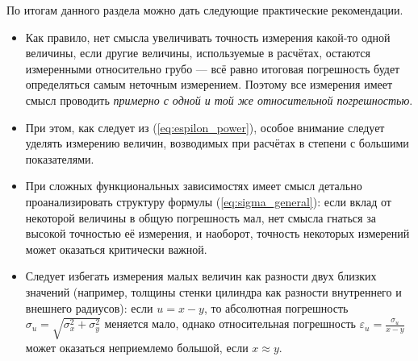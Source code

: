 По итогам данного раздела можно дать следующие практические рекомендации.
\begin{itemize}\small
\item Как правило, нет смысла увеличивать точность измерения какой-то одной
величины, если другие величины, используемые в расчётах, остаются
измеренными относительно грубо --- всё равно итоговая погрешность
будет определяться самым неточным измерением. Поэтому
все измерения имеет смысл проводить \emph{примерно с одной и той же
относительной погрешностью}.
\item При этом, как следует из (\ref{eq:espilon_power}), особое внимание
следует уделять измерению величин, возводимых при расчётах в степени
с большими показателями. 
\item При сложных функциональных зависимостях
имеет смысл детально проанализировать структуру формулы
(\ref{eq:sigma_general}):
если вклад от некоторой величины в общую погрешность мал, нет смысла
гнаться за высокой точностью её измерения, и наоборот, точность некоторых
измерений может оказаться критически важной.
\item Следует избегать измерения малых величин как разности двух близких
значений (например, толщины стенки цилиндра как разности внутреннего
и внешнего радиусов): если $u=x-y$, то абсолютная погрешность
$\sigma_{u}=\sqrt{\sigma_{x}^{2}+\sigma_{y}^{2}}$
меняется мало, однако относительная погрешность
$\varepsilon_{u}=\frac{\sigma_{u}}{x-y}$
может оказаться неприемлемо большой, если $x\approx y$.
\end{itemize}

